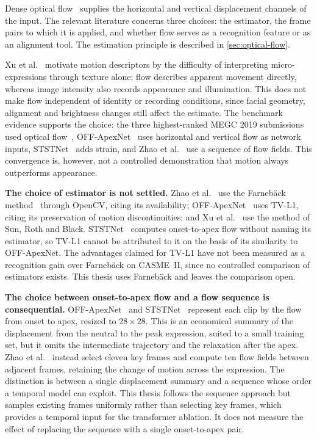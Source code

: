 Dense optical flow~\cite{horn1981} supplies the horizontal and vertical displacement channels of the input. The relevant literature concerns three choices: the estimator, the frame pairs to which it is applied, and whether flow serves as a recognition feature or as an alignment tool. The estimation principle is described in \autoref{sec:optical-flow}.

Xu et al.~\cite{xu2017} motivate motion descriptors by the difficulty of interpreting micro-expressions through texture alone: flow describes apparent movement directly, whereas image intensity also records appearance and illumination. This does not make flow independent of identity or recording conditions, since facial geometry, alignment and brightness changes still affect the estimate. The benchmark evidence supports the choice: the three highest-ranked MEGC 2019 submissions used optical flow~\cite{see2019}, OFF-ApexNet~\cite{liong2019a} uses horizontal and vertical flow as network inputs, STSTNet~\cite{liong2019b} adds strain, and Zhao et al.~\cite{zhaoS2021} use a sequence of flow fields. This convergence is, however, not a controlled demonstration that motion always outperforms appearance.

\textbf{The choice of estimator is not settled.} Zhao et al.~\cite{zhaoS2021} use the Farneb\"ack method~\cite{farneback2003} through OpenCV, citing its availability; OFF-ApexNet~\cite{liong2019a} uses TV-L1, citing its preservation of motion discontinuities; and Xu et al.~\cite{xu2017} use the method of Sun, Roth and Black. STSTNet~\cite{liong2019b} computes onset-to-apex flow without naming its estimator, so TV-L1 cannot be attributed to it on the basis of its similarity to OFF-ApexNet. The advantages claimed for TV-L1 have not been measured as a recognition gain over Farneb\"ack on CASME~II, since no controlled comparison of estimators exists. This thesis uses Farneb\"ack and leaves the comparison open.

\textbf{The choice between onset-to-apex flow and a flow sequence is consequential.} OFF-ApexNet~\cite{liong2019a} and STSTNet~\cite{liong2019b} represent each clip by the flow from onset to apex, resized to $28\times28$. This is an economical summary of the displacement from the neutral to the peak expression, suited to a small training set, but it omits the intermediate trajectory and the relaxation after the apex. Zhao et al.~\cite{zhaoS2021} instead select eleven key frames and compute ten flow fields between adjacent frames, retaining the change of motion across the expression. The distinction is between a single displacement summary and a sequence whose order a temporal model can exploit. This thesis follows the sequence approach but samples existing frames uniformly rather than selecting key frames, which provides a temporal input for the transformer ablation. It does not measure the effect of replacing the sequence with a single onset-to-apex pair.


